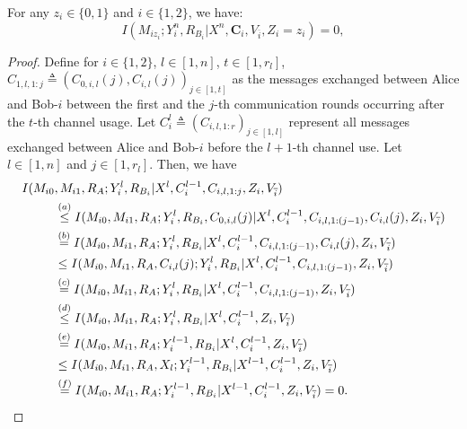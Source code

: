 \documentclass[10pt,a4paper]{amsart}
\begin{document}
\begin{lemma}\label{lemma: Rudolf-app}
For any $z_i\in \{0, 1\}$ and $i\in\{1,2\}$, we have: 
\[
I(M_{iz_i}; Y_i^n, R_{B_i} | X^n, \mathbf{C}_i,V_{\overline{i}}, Z_i = z_i) = 0,
\]
\end{lemma}

\begin{proof}
    Define for $i \in \{1,2\}$, $l \in [1, n]$, $t \in [1, r_l]$, $C_{1, l, 1:j} \triangleq (C_{0, i,l}(j), C_{i, l}(j))_{j \in [1, t]}$ as the messages exchanged between Alice and Bob-$i$ between the first and the $j$-th communication rounds occurring after the $t$-th channel usage. Let $C_i^l \triangleq (C_{i, l, 1:r})_{j \in [1, l]}$ represent all messages exchanged between Alice and Bob-$i$ before the $l+1$-th channel use. Let $l \in [1, n]$ and $j \in [1, r_l]$. Then, we have
\begin{align}\label{eq 1}
    I(M_{i0}&, M_{i1},  R_A; Y_i^l, R_{B_i} | X^l, C_i^{l-1},C_{i,l,1:j}, Z_i, V_{\overline{i}})\notag\\
    & \overset{(a)}{\leq} I(M_{i0}, M_{i1}, R_A; Y_i^l, R_{B_i}, C_{0,i,l}(j) | X^l, C_i^{l-1},C_{i,l,1:(j-1)}, C_{i,l}(j), Z_i, V_{\overline{i}})\\ 
    & \overset{(b)}{=} I(M_{i0}, M_{i1}, R_A; Y_i^l, R_{B_i} | X^l, C_i^{l-1},C_{i,l,1:(j-1)}, C_{i,l}(j), Z_i, V_{\overline{i}})\notag\\
    & \leq I(M_{i0}, M_{i1}, R_A, C_{i,l}(j); Y_i^l, R_{B_i} | X^l, C_i^{l-1},C_{i,l,1:(j-1)},  Z_i ,V_{\overline{i}})\notag\\
    &\overset{(c)}{=} I(M_{i0}, M_{i1}, R_A; Y_i^l, R_{B_i} | X^l, C_i^{l-1},C_{i,l,1:(j-1)}, Z_i, V_{\overline{i}})\label{eq 2} \\
    &\overset{(d)}{\leq} I(M_{i0}, M_{i1}, R_A; Y_i^{l}, R_{B_i} | X^l, C_i^{l-1}, Z_i, V_{\overline{i}}) \notag\\
    &\overset{(e)}{=} I(M_{i0}, M_{i1}, R_A ; Y_i^{l-1}, R_{B_i} | X^l, C_i^{l-1}, Z_i, V_{\overline{i}}) \notag\\
    &\leq I(M_{i0}, M_{i1}, R_A, X_{l}; Y_i^{l-1}, R_{B_i} | X^{l-1}, C_i^{l-1}, Z_i, V_{\overline{i}}) \notag\\
    &\overset{(f)}{=} I(M_{i0}, M_{i1}, R_A; Y_i^{l-1}, R_{B_i} | X^{l-1}, C_i^{l-1}, Z_i, V_{\overline{i}})\label{eq 3} = 0.    
\end{align}


\end{proof}
\end{document}

